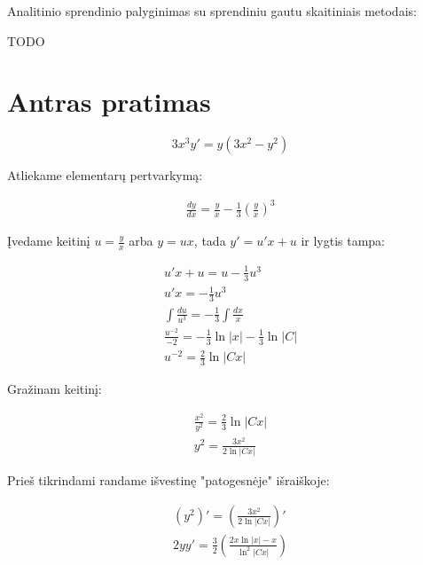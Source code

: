 \documentclass[11pt]{article}
\begin{document}
Analitinio sprendinio palyginimas su sprendiniu gautu skaitiniais metodais:

TODO

\section{Antras pratimas}

\begin{equation}
    3x^3y'=y(3x^2-y^2)
\end{equation}

Atliekame elementarų pertvarkymą:

\begin{equation}
\begin{split}
\frac{dy}{dx}=\frac{y}{x}-\frac{1}{3}\left(\frac{y}{x}\right)^3
\end{split}
\end{equation}

Įvedame keitinį $u=\frac{y}{x}$ arba $y=ux$, tada $y'=u'x+u$ ir lygtis tampa:

\begin{equation}
\begin{split}
u'x+u=u-\frac{1}{3}u^3\\
u'x=-\frac{1}{3}u^3\\
\int\frac{du}{u^3}=-\frac{1}{3}\int\frac{dx}{x}\\
\frac{u^{-2}}{-2}=-\frac{1}{3}\ln|x|-\frac{1}{3}\ln|C|\\
u^{-2}=\frac{2}{3}\ln|Cx|
\end{split}
\end{equation}

\newpage
Gražinam keitinį:

\begin{equation}
\begin{split}
\frac{x^2}{y^2}=\frac{2}{3}\ln|Cx|\\
y^2=\frac{3x^2}{2\ln|Cx|}
\end{split}
\end{equation}

Prieš tikrindami randame išvestinę "patogesnėje" išraiškoje:

\begin{equation}
\begin{split}
(y^2)'=\left(\frac{3x^2}{2\ln|Cx|}\right)'\\
2yy'=\frac{3}{2}\left(\frac{2x\ln|x|-x}{\ln^2|Cx|}\right)
\end{split}
\end{equation}
\end{document}
